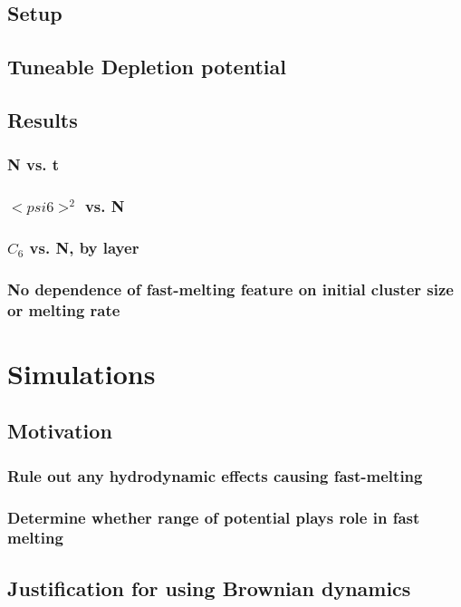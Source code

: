 \documentclass{umthesis}
\begin{document}
\subsection{Setup}
\label{sec-1.2.1}
\subsection{Tuneable Depletion potential}
\label{sec-1.2.2}
\subsection{Results}
\label{sec-1.2.3}
\subsubsection{N vs. t}
\label{sec-1.2.3.1}
\subsubsection{$< psi6 >^2$ vs. N}
\label{sec-1.2.3.2}
\subsubsection{$C_6$ vs. N, by layer}
\label{sec-1.2.3.3}
\subsubsection{No dependence of fast-melting feature on initial cluster size or melting rate}
\label{sec-1.2.3.4}
\section{Simulations}
\label{sec-1.3}
\subsection{Motivation}
\label{sec-1.3.1}
\subsubsection{Rule out any hydrodynamic effects causing fast-melting}
\label{sec-1.3.1.1}
\subsubsection{Determine whether range of potential plays role in fast melting}
\label{sec-1.3.1.2}
\subsection{Justification for using Brownian dynamics}
\label{sec-1.3.2}
\end{document}
